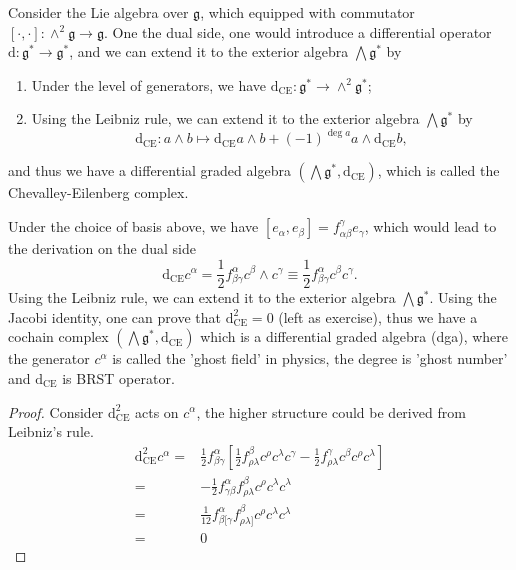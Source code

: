 \documentclass[10pt]{article}
\begin{document}
Consider the Lie algebra over $ \mathfrak{g}$, which equipped with commutator $[\cdot, \cdot] : \wedge^{2} \mathfrak{g} \rightarrow \mathfrak{g}$. One the dual side, one would introduce a differential operator $ \mathrm{d} : \mathfrak{g}^{*} \rightarrow \mathfrak{g}^{*}$, and we can extend it to the exterior algebra $ \bigwedge \mathfrak{g}^{*}$ by
\begin{enumerate}[(1)]
  \item Under the level of generators, we have $ \mathrm{d} _{\mathrm{CE}} : \mathfrak{g}^{*} \rightarrow \wedge^{2} \mathfrak{g}^{*}$;
  \item Using the Leibniz rule, we can extend it to the exterior algebra $ \bigwedge \mathfrak{g}^{*}$ by
    \begin{equation*}
      \mathrm{d} _{\mathrm{CE}} : a \wedge b \mapsto \mathrm{d} _{\mathrm{CE}} a \wedge b + (-1)^{\deg a} a \wedge \mathrm{d} _{\mathrm{CE}} b,
    \end{equation*}
\end{enumerate}
and thus we have a differential graded algebra $ \left( \bigwedge \mathfrak{g}^{*}, \mathrm{d} _{\mathrm{CE}} \right)$, which is called the Chevalley-Eilenberg complex.

Under the choice of basis above, we have $[e_{\alpha} , e_{\beta}] = f^{\gamma}_{\alpha \beta} e_{\gamma}$, which would lead to the derivation on the dual side
\begin{equation*}
  \mathrm{d} _{\mathrm{CE}} c^{\alpha} = \frac{1}{2} f^{\alpha}_{\beta \gamma} c^{\beta} \wedge c^{\gamma} \equiv \frac{1}{2}f^{\alpha}_{\beta \gamma} c^{\beta}c^{\gamma}.
\end{equation*}
Using the Leibniz rule, we can extend it to the exterior algebra $ \bigwedge \mathfrak{g}^{*}$. Using the Jacobi identity, one can prove that $ \mathrm{d} _{\mathrm{CE}}^{2} = 0$ (left as exercise), thus we have a cochain complex $\left( \bigwedge \mathfrak{g}^{*}, \mathrm{d} _{\mathrm{CE}} \right)$ which is a differential graded algebra (dga),
where the generator $ c^{\alpha} $ is called the 'ghost field' in physics, the degree is 'ghost number' and $ \mathrm{d} _{\mathrm{CE}}$ is BRST operator.
\begin{proof}
  Consider $ \mathrm{d} _{\mathrm{CE}}^{2}$ acts on $ c^{\alpha}$, the higher structure could be derived from Leibniz's rule.
  \begin{equation*}
    \begin{aligned}
      \mathrm{d} ^{2}_{\mathrm{CE}} c^{\alpha} = & \frac{1}{2} f^{\alpha}_{\beta \gamma} \left[ \frac{1}{2} f^{\beta}_{\rho \lambda} c^{\rho} c^{\lambda} c^{\gamma} - \frac{1}{2} f^{\gamma}_{\rho \lambda} c^{\beta} c^{\rho} c^{\lambda} \right] \\
      = & - \frac{1}{2} f^{\alpha}_{\gamma \beta} f^{\beta}_{\rho \lambda} c^{\rho} c^{\lambda} c^{\lambda} \\
      = & \frac{1}{12} f_{\beta [\gamma}^{\alpha} f_{\rho \lambda]}^{\beta} c^{\rho} c^{\lambda} c^{\lambda} \\
      = & 0
    \end{aligned}
  \end{equation*}
\end{proof}
\end{document}
